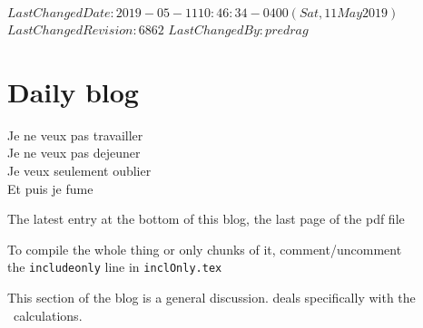 \ifsvnmulti
 {$LastChangedDate: 2019-05-11 10:46:34 -0400 (Sat, 11 May 2019) $}
 {$LastChangedRevision: 6862 $} {$LastChangedBy: predrag $}
\fi

\chapter{Daily blog}
\label{c-DailyBlog}

\begin{bartlett}{
Je ne veux pas travailler\\
Je ne veux pas dejeuner\\
Je veux seulement oublier\\
Et puis je fume
            }
\end{bartlett}

\renewcommand{\ssp}{x}
\renewcommand{\vel}{\ensuremath{v}}   %


\bigskip\bigskip

\noindent
{\color{red} The latest entry at the bottom of this blog,
the last page of the pdf file}
\bigskip\bigskip

To compile the whole thing or only chunks of it,
comment/uncomment \\
the \texttt{includeonly} line in \texttt{inclOnly.tex}

\bigskip\bigskip

This section of the blog is a general discussion.
 deals specifically with the
\KS\ calculations.



